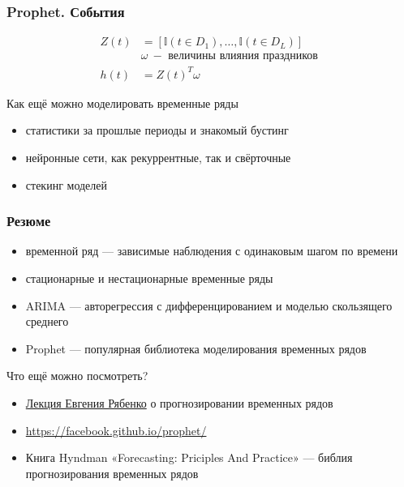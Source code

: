 \documentclass[fullscreen=true, bookmarks=true, hyperref={pdfencoding=unicode}]{beamer}
\begin{document}
\begin{frame}
  \frametitle{Prophet. События}

  \begin{align*}
    Z(t) &= [\mathbb{I}(t \in D_1), \dots, \mathbb{I}(t \in D_L)]\\
         &\omega\ - \text{ величины влияния праздников } \\
       h(t) &= Z(t)^T \omega
  \end{align*}

  \begin{block}{Как ещё можно моделировать временные ряды}
    \begin{itemize}
      \item статистики за прошлые периоды и знакомый бустинг
      \item нейронные сети, как рекуррентные, так и свёрточные
      \item стекинг моделей
    \end{itemize}
  \end{block}

\end{frame}


\begin{frame}
  \frametitle{Резюме}
  \begin{itemize}
    \item временной ряд — зависимые наблюдения с одинаковым шагом по времени
    \item стационарные и нестационарные временные ряды
    \item ARIMA — авторегрессия с дифференцированием и моделью скользящего среднего
    \item Prophet — популярная библиотека моделирования временных рядов
  \end{itemize}
  \pause
  Что ещё можно посмотреть?
  \begin{itemize}
    \item \href{https://www.youtube.com/watch?v=u433nrxdf5k}{Лекция Евгения Рябенко} о прогнозировании временных рядов
    \item \href{https://facebook.github.io/prophet/}{https://facebook.github.io/prophet/}
    \item Книга Hyndman «Forecasting: Priciples And Practice» — библия прогнозирования временных рядов
  \end{itemize}
\end{frame}
\end{document}

